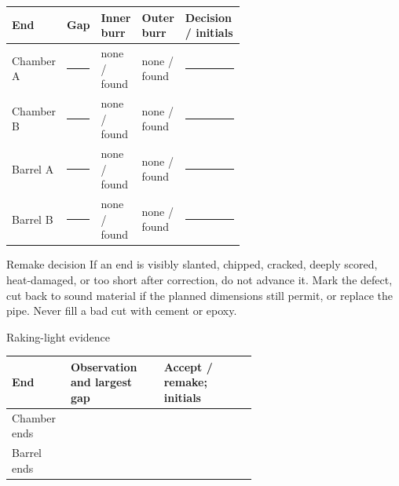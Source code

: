 \begin{tabularx}{\linewidth}{@{}p{0.18\linewidth}p{0.13\linewidth}p{0.14\linewidth}p{0.14\linewidth}L@{}}
\toprule
\textbf{End} & \textbf{Gap} & \textbf{Inner burr} & \textbf{Outer burr} & \textbf{Decision / initials}\\
\midrule
Chamber A & \rule{0.42in}{0.4pt} & none / found & none / found & \rule{1.05in}{0.4pt}\\
Chamber B & \rule{0.42in}{0.4pt} & none / found & none / found & \rule{1.05in}{0.4pt}\\
Barrel A & \rule{0.42in}{0.4pt} & none / found & none / found & \rule{1.05in}{0.4pt}\\
Barrel B & \rule{0.42in}{0.4pt} & none / found & none / found & \rule{1.05in}{0.4pt}\\
\bottomrule
\end{tabularx}

\begin{teloshazard}{Remake decision}
If an end is visibly slanted, chipped, cracked, deeply scored, heat-damaged, or
too short after correction, do not advance it. Mark the defect, cut back to
sound material if the planned dimensions still permit, or replace the pipe.
Never fill a bad cut with cement or epoxy.
\end{teloshazard}

\begin{teloscard}{Raking-light evidence}
\begin{tabularx}{\linewidth}{@{}p{0.24\linewidth}p{0.38\linewidth}L@{}}
\toprule
\textbf{End} & \textbf{Observation and largest gap} & \textbf{Accept / remake; initials}\\
\midrule
Chamber ends & \rule{0pt}{1.7em} & \\
Barrel ends & \rule{0pt}{1.7em} & \\
\bottomrule
\end{tabularx}
\end{teloscard}

\clearpage
